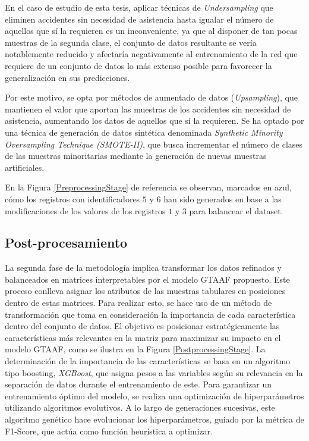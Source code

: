 En el caso de estudio de esta tesis, aplicar técnicas de \textit{Undersampling} que eliminen accidentes sin necesidad de asistencia hasta igualar el número de aquellos que sí la requieren es un inconveniente, ya que al disponer de tan pocas muestras de la segunda clase, el conjunto de datos resultante se vería notablemente reducido y afectaría negativamente al entrenamiento de la red que requiere de un conjunto de datos lo más extenso posible para favorecer la generalización en sus predicciones.

Por este motivo, se opta por métodos de aumentado de datos (\textit{Upsampling}), que mantienen el valor que aportan las muestras de los accidentes sin necesidad de asistencia, aumentando los datos de aquellos que sí la requieren. Se ha optado por una técnica de generación de datos sintética denominada \textit{Synthetic Minority Oversampling Technique (SMOTE-II)}, que busca incrementar el número de clases de las muestras minoritarias mediante la generación de nuevas muestras artificiales.

En la Figura \ref{PreprocessingStage} de referencia se observan, marcados en azul, cómo los registros con identificadores $5$ y $6$ han sido generados en base a las modificaciones de los valores de los registros $1$ y $3$ para balancear el dataset.



\subsection{Post-procesamiento}

La segunda fase de la metodología implica transformar los datos refinados y balanceados en matrices interpretables por el modelo GTAAF propuesto. Este proceso conlleva asignar los atributos de las muestras tabulares en posiciones dentro de estas matrices. Para realizar esto, se hace uso de un método de transformación que toma en consideración la importancia de cada característica dentro del conjunto de datos. El objetivo es posicionar estratégicamente las características más relevantes en la matriz para maximizar su impacto en el modelo GTAAF, como se ilustra en la Figura \ref{PostprocessingStage}. La determinación de la importancia de las características se basa en un algoritmo tipo boosting, \textit{XGBoost}, que asigna pesos a las variables según su relevancia en la separación de datos durante el entrenamiento de este. Para garantizar un entrenamiento óptimo del modelo, se realiza una optimización de hiperparámetros utilizando algoritmos evolutivos. A lo largo de generaciones sucesivas, este algoritmo genético hace evolucionar los hiperparámetros, guiado por la métrica de F1-Score, que actúa como función heurística a optimizar.

